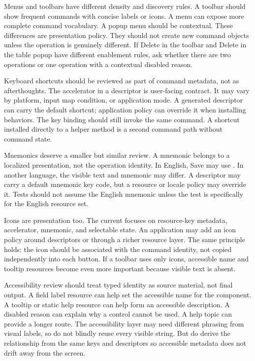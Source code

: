 Menus and toolbars have different density and discovery rules. A toolbar
should show frequent commands with concise labels or icons. A menu can expose
more complete command vocabulary. A popup menu should be contextual. These
differences are presentation policy. They should not create new command
objects unless the operation is genuinely different. If Delete in the toolbar
and Delete in the table popup have different enablement rules, ask whether
there are two operations or one operation with a contextual disabled reason.

Keyboard shortcuts should be reviewed as part of command metadata, not as
afterthoughts. The accelerator in a descriptor is user-facing contract. It may
vary by platform, input map condition, or application mode. A generated
descriptor can carry the default shortcut; application policy can override it
when installing behaviors. The key binding should still invoke the same
command. A shortcut installed directly to a helper method is a second command
path without command state.

Mnemonics deserve a smaller but similar review. A mnemonic belongs to a
localized presentation, not the operation identity. In English, Save may use
. In another language, the visible text and mnemonic may differ. A
descriptor may carry a default mnemonic key code, but a resource or locale
policy may override it. Tests should not assume the English mnemonic unless
the test is specifically for the English resource set.

Icons are presentation too. The current  focuses on
resource-key metadata, accelerator, mnemonic, and selectable state. An
application may add an icon policy around descriptors or through a richer
resource layer. The same principle holds: the icon should be associated with
the command identity, not copied independently into each button. If a toolbar
uses only icons, accessible name and tooltip resources become even more
important because visible text is absent.

Accessibility review should treat typed identity as source material, not final
output. A field label resource can help set the accessible name for the
component. A tooltip or static help resource can help form an accessible
description. A disabled reason can explain why a control cannot be used. A help
topic can provide a longer route. The accessibility layer may need different
phrasing from visual labels, so do not blindly reuse every visible string. But
do derive the relationship from the same keys and descriptors so accessible
metadata does not drift away from the screen.

